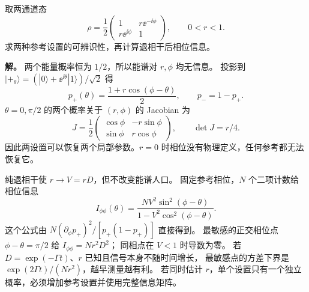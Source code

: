 \begin{exbox}
取两通道态
\begin{equation}
\rho=\frac12\begin{pmatrix}1&r\ee^{-\ii\phi}\\r\ee^{\ii\phi}&1\end{pmatrix},
\qquad0<r<1.
\label{eq:feqo-two-level-state}
\end{equation}
求两种参考设置的可辨识性，再计算退相干后相位信息。

\textbf{解。}
两个能量概率恒为 $1/2$，所以能谱对 $r,\phi$ 均无信息。
投影到 $|+_\theta\rangle=(|0\rangle+\ee^{\ii\theta}|1\rangle)/\sqrt2$ 得
\begin{equation}
p_+(\theta)=\frac{1+r\cos(\phi-\theta)}2,
\qquad p_-=1-p_+.
\label{eq:feqo-reference-phase-probability}
\end{equation}
$\theta=0,\pi/2$ 的两个概率关于 $(r,\phi)$ 的 Jacobian 为
\begin{equation}
J=\frac12\begin{pmatrix}\cos\phi&-r\sin\phi\\
\sin\phi&r\cos\phi\end{pmatrix},\qquad\det J=r/4.
\label{eq:feqo-jacobian-two-level}
\end{equation}
因此两设置可以恢复两个局部参数。$r=0$ 时相位没有物理定义，任何参考都无法恢复它。

纯退相干使 $r\to V=rD$，但不改变能谱人口。
固定参考相位，$N$ 个二项计数给相位信息
\begin{equation}
I_{\phi\phi}(\theta)
=\frac{NV^2\sin^2(\phi-\theta)}{1-V^2\cos^2(\phi-\theta)}.
\label{eq:feqo-fisher-phase-decoherence}
\end{equation}
这个公式由 $N(\partial_\phi p_+)^2/[p_+(1-p_+)]$ 直接得到。
最敏感的正交相位点 $\phi-\theta=\pi/2$ 给 $I_{\phi\phi}=Nr^2D^2$；
同相点在 $V<1$ 时导数为零。
若 $D=\exp(-\Gamma t)$、$r$ 已知且信号本身不随时间增长，
最敏感点的方差下界是 $\exp(2\Gamma t)/(Nr^2)$，越早测量越有利。
若同时估计 $r$，单个设置只有一个独立概率，必须增加参考设置并使用完整信息矩阵。
\end{exbox}
